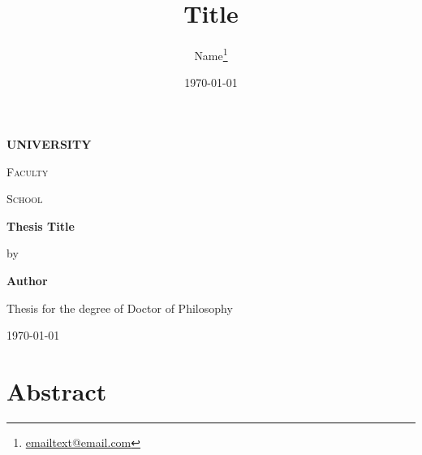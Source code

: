 \documentclass[12pt,a4paper,twoside]{report}
\begin{document}
	
\listoftodos

	\title{Title}
	

	\author{Name\footnote{\href{mailto:email@email.com}{emailtext@email.com}}}
	
	
	

	\date{\today}

\begin{titlepage}
	\centering
	{\large \bfseries \uppercase{University} \par}
	\vspace{0.5cm}
	{\scshape\large Faculty \par}
	\vspace{0.25cm}
	{\scshape\large School \par}
	\vspace{5cm}
	{\bfseries\large Thesis Title\par}
	\vspace{1cm}
	{\large by \par}
	\vspace{1cm}
	{\bfseries\large  Author\par}
	
	\vfill
	
	{\large Thesis for the degree of Doctor of Philosophy \par}
	\vspace{1cm}		
	{\large \monthyeardate\today \par}
\end{titlepage}

	
\pagestyle{fancy}
\fancyhf{}
\fancyhead[RE,LO]{\leftmark}%
\fancyhead[LE,RO]{\thepage}
\renewcommand{\chaptermark}[1]{\markboth{\chaptername\ \thechapter\ #1}{}}




\thispagestyle{empty}

\chapter*{\centering Abstract}
\end{document}
